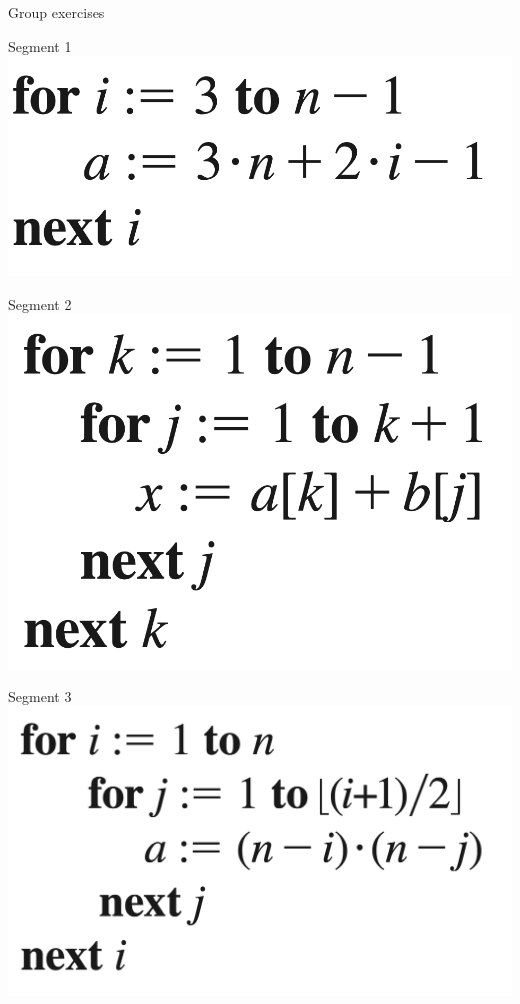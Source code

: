 \documentclass[10pt]{beamer}
\begin{document}
\begin{frame}{Group exercises}
\centering
\begin{minipage}{0.3\textwidth}
    \centering
    \small Segment 1 \\
    \vspace{.2cm}
    \includegraphics[width=\linewidth]{images/epp_hw_6}%
\end{minipage}
\hfill
\begin{minipage}{0.3\textwidth}
    \centering
    \small Segment 2 \\
      \vspace{.2cm}
    \includegraphics[width=\linewidth]{images/epp_hw_11}%
\end{minipage}
\hfill
\begin{minipage}{0.3\textwidth}
    \centering
     \small Segment 3 \\
       \vspace{.2cm}
    \includegraphics[width=\linewidth]{images/epp_hw_17}%
\end{minipage}


\end{frame}
\end{document}
